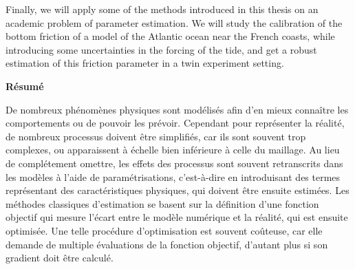 Finally, we will apply some of the methods introduced in this thesis on an
academic problem of parameter estimation. We will study the
calibration of the bottom friction of a model of the Atlantic ocean
near the French coasts, while introducing some uncertainties in the
forcing of the tide, and get a robust estimation of this friction
parameter in a twin experiment setting.



%
%
%

\vspace{0.2cm}
\vfill
\etoile
\vfill
\vspace{0.2cm}
\begin{center}
\small  \bf Résumé
\end{center}
\vspace{0.3cm} 

De nombreux phénomènes physiques sont modélisés afin d'en mieux
connaître les comportements ou de pouvoir les prévoir. Cependant pour
représenter la réalité, de nombreux processus doivent être simplifiés,
car ils sont souvent trop complexes, ou apparaissent à échelle bien
inférieure à celle du maillage. Au lieu de complétement omettre, les
effets des processus sont souvent retranscrits dans les modèles à
l'aide de paramétrisations, c'est-à-dire en introduisant des termes
représentant des caractéristiques physiques, qui doivent être ensuite
estimées. Les méthodes classiques d'estimation se basent sur la
définition d'une fonction objectif qui mesure l'écart entre le modèle
numérique et la réalité, qui est ensuite optimisée. Une telle
procédure d'optimisation est souvent coûteuse, car elle demande de
multiple évaluations de la fonction objectif, d'autant plus si son
gradient doit être calculé.

